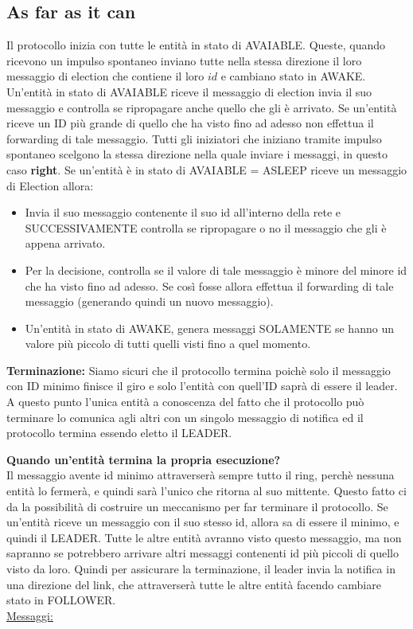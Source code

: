 \subsection{As far as it can}\label{asfar}
Il protocollo inizia con tutte le entità in stato di AVAIABLE. Queste, quando ricevono un impulso spontaneo inviano tutte nella stessa direzione il loro messaggio di election che contiene il loro $id$ e cambiano stato in AWAKE. Un'entità in stato di AVAIABLE riceve il messaggio di election invia il suo messaggio e controlla se ripropagare anche quello che gli è arrivato.
Se un'entità riceve un ID più grande di quello che ha visto fino ad adesso non effettua il forwarding di tale messaggio. Tutti gli iniziatori che iniziano tramite impulso spontaneo scelgono la stessa direzione nella quale inviare i messaggi, in questo caso \textbf{right}. Se un'entità è in stato di AVAIABLE = ASLEEP riceve un messaggio di Election allora:
\begin{itemize}
    \item Invia il suo messaggio contenente il suo id all'interno della rete e SUCCESSIVAMENTE controlla se ripropagare o no il messaggio che gli è appena arrivato.
    \item Per la decisione, controlla se  il valore di tale messaggio è minore del minore id che ha visto fino ad adesso. Se così fosse allora effettua il forwarding di tale messaggio (generando quindi un nuovo messaggio).
    \item Un'entità in stato di AWAKE, genera messaggi SOLAMENTE se hanno un valore più piccolo di tutti quelli visti fino a quel momento.
\end{itemize}
\textbf{Terminazione:} Siamo sicuri che il protocollo termina poichè solo il messaggio con ID minimo finisce il giro e solo l'entità con quell'ID saprà di essere il leader. A questo punto l'unica entità a conoscenza del fatto che il protocollo può terminare lo comunica agli altri con un singolo messaggio di notifica ed il protocollo termina essendo eletto il LEADER.

\textbf{Quando un'entità termina la propria esecuzione?}\\
Il messaggio avente id minimo attraverserà sempre tutto il ring, perchè nessuna entità lo fermerà, e quindi sarà l'unico che ritorna al suo mittente. Questo fatto ci da la possibilità di costruire un meccanismo per far terminare il protocollo. Se un'entità riceve un messaggio con il suo stesso id, allora sa di essere il minimo, e quindi il LEADER. Tutte le altre entità avranno visto questo messaggio, ma non sapranno se potrebbero arrivare altri messaggi contenenti id più piccoli di quello visto da loro. Quindi per assicurare la terminazione, il leader invia la notifica in una direzione del link, che attraverserà tutte le altre entità facendo cambiare stato in FOLLOWER.\\
\underline{Messaggi:}

